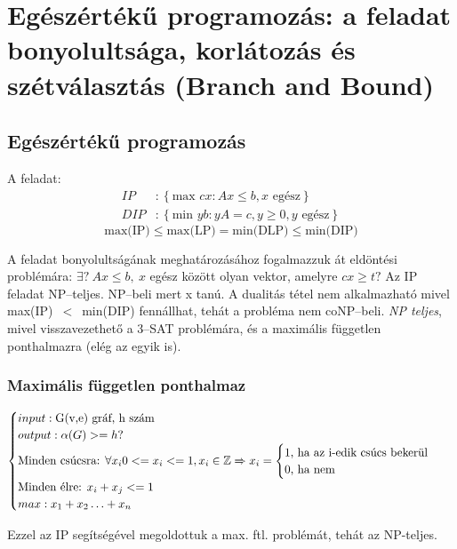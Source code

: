 \skiptooddpage%
\section[Egészértékű programozás]{Egészértékű programozás: a feladat bonyolultsága, korlátozás és szétválasztás (Branch and Bound)}

\subsection{Egészértékű programozás}
A feladat:
\begin{align*}
	IP  & : \left\{\mbox{max }{cx: Ax \leq b, x \mbox{ egész}}\right\}       \\
	DIP & : \left\{ \mbox{min }{yb: yA=c, y \geq 0, y \mbox{ egész}}\right\}
\end{align*}
\[ \mbox{max(IP)} \leq \mbox{max(LP)}= \mbox{min(DLP)} \leq \mbox{min(DIP)} \]

A feladat bonyolultságának meghatározásához fogalmazzuk át eldöntési problémára:
$\exists?~Ax \leq b,~ x$ egész között olyan vektor, amelyre $cx \geq t?$ Az IP
feladat NP--teljes. NP--beli mert x tanú. A dualitás tétel nem alkalmazható
mivel max(IP)~$<$~min(DIP) fennállhat, tehát a probléma nem coNP--beli.
\emph{NP teljes}, mivel visszavezethető a $3$--SAT problémára, és a maximális
független ponthalmazra (elég az egyik is).

\subsubsection{Maximális független ponthalmaz}

$ \begin{cases}
		input: \mbox{G(v,e) gráf, h szám}           \\
		output: \alpha (G) >= h?                    \\
		\mbox{Minden csúcsra: }
		\forall x_i 0 <= x_i <= 1, x_i \in \mathbb{Z}
		\xRightarrow{}
		x_i = \begin{cases}
			      \mbox{1, ha az i-edik csúcs bekerül} \\
			      \mbox{0, ha nem}
		      \end{cases} \\
		\mbox{Minden élre: }
		x_i + x_j <= 1                              \\
		max: x_1 + x_2 \ldots + x_n
	\end{cases}$

Ezzel az IP segítségével megoldottuk a max. ftl. problémát, tehát az NP-teljes.

